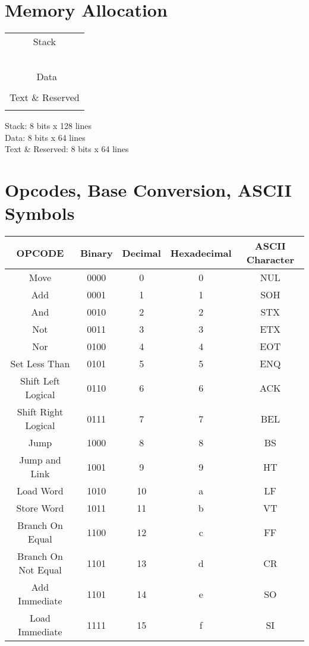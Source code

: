 \documentclass[12pt]{article}
\begin{document}
\section*{Memory Allocation}
\begin{center}
\begin{tabular}{ |c| } 
 \hline
 Stack 		\\\\\\\\\\\\ 
\hline
 \ Data  \\\\
  \hline 
 Text \& Reserved \\\\
 \hline
\end{tabular}
\end{center}

\begin{center}
Stack: 8 bits x 128 lines \\
Data: 8 bits x  64 lines\\
Text \& Reserved: 8 bits x 64 lines \\
\end{center}

\section*{Opcodes, Base Conversion, ASCII Symbols}
\begin{center}
\begin{tabular}{ |c|c|c|c|c| } 
 \hline
 OPCODE & Binary & Decimal & Hexadecimal & ASCII Character \\ 
 \hline
 Move & 0000 & 0 & 0 & NUL\\ 
  \hline
 Add & 0001 & 1 & 1 & SOH\\ 
  \hline
  And & 0010 & 2 & 2 & STX\\ 
 \hline
  Not & 0011 & 3 & 3 & ETX\\ 
  \hline
 Nor & 0100 & 4 & 4 & EOT\\ 
  \hline
 Set Less Than & 0101 & 5 & 5 & ENQ\\ 
 \hline
 Shift Left Logical & 0110 & 6 & 6 & ACK\\ 
  \hline
 Shift Right Logical & 0111 & 7 & 7 & BEL\\ 
  \hline
  Jump & 1000 & 8 & 8 & BS\\ 
  \hline
  Jump and Link & 1001 & 9 & 9 & HT\\ 
  \hline
 Load Word & 1010 & 10 & a & LF\\ 
  \hline
 Store Word & 1011 & 11 & b & VT\\
  \hline 
 Branch On Equal & 1100 & 12 & c & FF\\ 
 \hline
   Branch On Not Equal & 1101 & 13 & d & CR\\ 
  \hline
 Add Immediate & 1101 & 14 & e & SO\\ 
  \hline
 Load Immediate & 1111 & 15 & f & SI\\ 
 \hline
 
\end{tabular}
\end{center}
\end{document}
